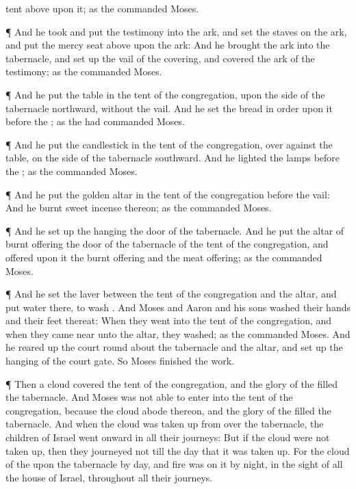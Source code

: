 {tent
above upon it; as the
{}
commanded
Moses.
\par }{\PP {}¶ And he
took and
put the
testimony into the
ark, and
set the
staves on the
ark, and
put the mercy
seat
above upon the
ark:
And he
brought the
ark into the
tabernacle, and set
up the
vail of the
covering, and
covered the
ark of the
testimony; as the
{}
commanded
Moses.
\par }{\PP {}¶ And he
put the
table in the
tent of the
congregation, upon the
side of the
tabernacle
northward,
without the
vail.
And he
set the
bread in
order upon it
before the
{}; as the
{} had
commanded
Moses.
\par }{\PP {}¶ And he
put the
candlestick in the
tent of the
congregation, over
against the
table, on the
side of the
tabernacle
southward.
And he
lighted the
lamps
before the
{}; as the
{}
commanded
Moses.
\par }{\PP {}¶ And he
put the
golden
altar in the
tent of the
congregation
before the
vail:
And he
burnt
sweet
incense thereon; as the
{}
commanded
Moses.
\par }{\PP {}¶ And he set
up the
hanging
{} the
door of the
tabernacle.
And he
put the
altar of burnt
offering
{} the
door of the
tabernacle of the
tent of the
congregation, and
offered upon it the burnt
offering and the meat
offering; as the
{}
commanded
Moses.
\par }{\PP {}¶ And he
set the
laver between the
tent of the
congregation and the
altar, and
put
water there, to
wash
{}.
And
Moses and
Aaron and his
sons
washed their
hands and their
feet thereat:
When they
went into the
tent of the
congregation, and when they came
near unto the
altar, they
washed; as the
{}
commanded
Moses.
And he reared
up the
court round
about the
tabernacle and the
altar, and set
up the
hanging of the
court
gate. So
Moses
finished the
work.
\par }{\PP {}¶ Then a
cloud
covered the
tent of the
congregation, and the
glory of the
{}
filled the
tabernacle.
And
Moses was not
able to
enter into the
tent of the
congregation, because the
cloud
abode thereon, and the
glory of the
{}
filled the
tabernacle.
And when the
cloud was taken
up
from over the
tabernacle, the
children of
Israel went
onward in all their
journeys:
But if the
cloud were not taken
up, then they
journeyed not till the
day that it was taken
up.
For the
cloud of the
{}
{} upon the
tabernacle by
day, and
fire was on it by
night, in the
sight of all the
house of
Israel, throughout all their
journeys.
\par }